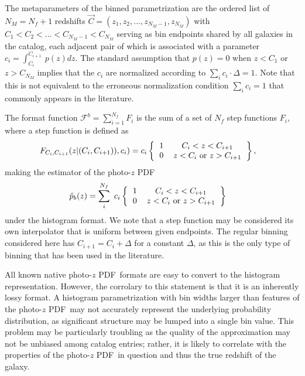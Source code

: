 \documentclass[\docopts]{\docclass}
\newcommand{\pz}{photo-$z$ PDF}
\begin{document}
The metaparameters of the binned parametrization are the ordered list of 
$N_{M}=N_{f}+1$ redshifts $\vec{C} = (z_{1}, z_{2}, \dots, z_{N_{M}-1}, 
z_{N_{M}})$ with $C_{1} < C_{2} < \dots < C_{N_{M}-1} < C_{N_{M}}$ serving as 
bin endpoints shared by all galaxies in the catalog, each adjacent pair of 
which is associated with a parameter $c_{i}=\int_{C_{i}}^{C_{i+1}}\ p(z)dz$.  
The standard assumption that $p(z)=0$ when $z<C_{1}$ or $z>C_{N_{M}}$ implies 
that the $c_{i}$ are normalized according to $\sum_{i} c_{i}\cdot\Delta = 1$.  
Note that this is not equivalent to the erroneous normalization condition 
$\sum_{i} c_{i} = 1$ that commonly appears in the literature.

The format function $\mathcal{F}^{b}=\sum_{i=1}^{N_{f}}F_{i}$ is the sum of a 
set of $N_{f}$ step functions $F_{i}$, where a step function is defined as
\begin{align}
  \label{eq:step}
  F_{C_{i}, C_{i+1}}(z| (C_{i}, C_{i+1})), c_{i}) &= c_{i} 
\left\{\begin{tabular}{cc}$1$&$C_{i}<z<C_{i+1}$\\
0&$z < C_{i}$\ or\ $z > C_{i+1}$\end{tabular}\right\},
\end{align}
making the estimator of the \pz\
\begin{align}
  \label{eq:binned}
  \hat{p}_{b}(z) &= \sum_{i}^{N_{f}}\ c_{i} 
\left\{\begin{tabular}{cc}$1$&$C_{i}<z<C_{i+1}$\\
0&$z < C_{i}$\ or\ $z > C_{i+1}$\end{tabular}\right\}
\end{align}
under the histogram format.  We note that a step function may be considered its 
own interpolator that is uniform between given endpoints.  The regular binning 
considered here has $C_{i+1}=C_{i}+\Delta$ for a constant $\Delta$, as this is 
the only type of binning that has been used in the literature.

All known native \pz\ formats are easy to convert to the histogram 
representation.  However, the corrolary to this statement is that it is an 
inherently lossy format.  A histogram parametrization with bin widths larger 
than features of the \pz\ may not accurately represent the underlying 
probability distribution, as significant structure may be lumped into a single 
bin value.  This problem may be particularly troubling as the quality of the 
approximation may not be unbiased among catalog entries; rather, it is likely 
to correlate with the properties of the \pz\ in question and thus the true 
redshift of the galaxy.
\end{document}

